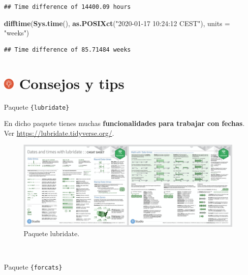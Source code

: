 \documentclass[11pt,]{book}
\newenvironment{Shaded}{\begin{snugshade}}{\end{snugshade}}
\newcommand{\DataTypeTok}[1]{\textcolor[rgb]{0.27,0.27,0.27}{#1}}
\newcommand{\KeywordTok}[1]{\textcolor[rgb]{0.27,0.27,0.27}{\textbf{#1}}}
\newcommand{\NormalTok}[1]{#1}
\newcommand{\StringTok}[1]{\textcolor[rgb]{0.5,0.5,0.5}{#1}}
\begin{document}
\begin{verbatim}
## Time difference of 14400.09 hours
\end{verbatim}

\begin{Shaded}
\begin{Highlighting}[]
\KeywordTok{difftime}\NormalTok{(}\KeywordTok{Sys.time}\NormalTok{(), }\KeywordTok{as.POSIXct}\NormalTok{(}\StringTok{"2020-01-17 10:24:12 CEST"}\NormalTok{), }\DataTypeTok{units =} \StringTok{"weeks"}\NormalTok{)}
\end{Highlighting}
\end{Shaded}

\begin{verbatim}
## Time difference of 85.71484 weeks
\end{verbatim}

\hypertarget{consejos-y-tips-7}{%
\section[ Consejos y tips]{\texorpdfstring{\protect\includegraphics[width=0.04\textwidth,height=\textheight]{img/logo_info.png} Consejos y tips}{ Consejos y tips}}\label{consejos-y-tips-7}}

Paquete \texttt{\{lubridate\}}

En dicho paquete tienes muchas \textbf{funcionalidades para trabajar con fechas}. Ver \url{https://lubridate.tidyverse.org/}.

\begin{figure}

{\centering \includegraphics[width=0.95\linewidth]{./img/lubridate} 

}

\caption{Paquete lubridate.}\label{fig:lubridate}
\end{figure}

~

Paquete \texttt{\{forcats\}}
\end{document}
